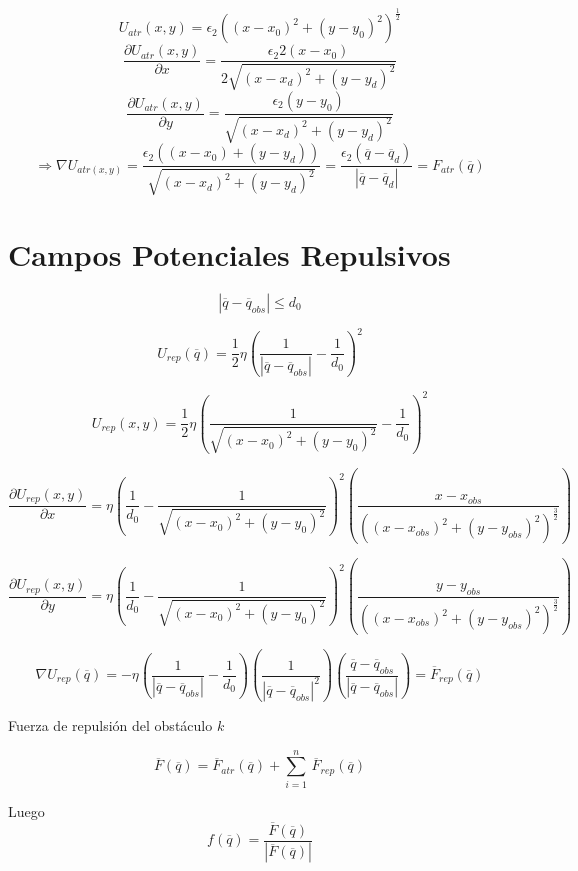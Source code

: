 $$U_{atr}(x,y) = \epsilon_{2} \left( (x - x_{0})^2 + (y - y_{0})^2 \right)^\frac{1}{2}
$$ 
$$\dfrac{\partial U_{atr}(x,y)}{\partial x} = \dfrac{\epsilon_{2}2(x - x_{0})}{2\sqrt{(x - x_{d})^2 + (y - y_{d})^2}}
$$
$$\dfrac{\partial U_{atr}(x,y)}{\partial y} = \dfrac{\epsilon_{2}(y - y_{0})}{\sqrt{(x - x_{d})^2 + (y - y_{d})^2}}
$$
$$\Rightarrow \nabla U_{atr(x,y)} = \dfrac{\epsilon_{2}\left( (x - x_{0}) + (y - y_{d})\right) }{\sqrt{(x - x_{d})^2 + (y - y_{d})^2}} = \dfrac{\epsilon_{2}(\overline{q} - \overline{q}_d)}{\left| \overline{q} - \overline{q}_{d} \right|} = F_{atr}(\overline{q})
$$



\section{Campos Potenciales Repulsivos}

$$\left| \overline{q} - \overline{q}_{obs}\right| \leq d_{0}$$ 

$$U_{rep}(\overline{q}) = \dfrac{1}{2} \eta \left( \dfrac{1}{\left| \overline{q} - \overline{q}_{obs}\right|}  
- \dfrac{1}{d_{0}} \right)^2$$

$$U_{rep}(x,y) = \dfrac{1}{2} \eta \left( \dfrac{1}{\sqrt{(x - x_{0})^2 + (y - y_{0})^2}}  
- \dfrac{1}{d_{0}} \right)^2$$

$$\dfrac{\partial U_{rep}(x,y)}{\partial x} = \eta \left( \dfrac{1}{d_{0}}  
-  \dfrac{1}{\sqrt{(x - x_{0})^2 + (y - y_{0})^2}} \right)^2 \left( \dfrac{x - x_{obs}}{\left( (x - x_{obs})^2 + (y - y_{obs})^2 \right)^{\frac{3}{2}}} \right)$$

$$\dfrac{\partial U_{rep}(x,y)}{\partial y} = \eta \left( \dfrac{1}{d_{0}}  
-  \dfrac{1}{\sqrt{(x - x_{0})^2 + (y - y_{0})^2}} \right)^2 \left( \dfrac{y - y_{obs}}{\left( (x - x_{obs})^2 + (y - y_{obs})^2 \right)^{\frac{3}{2}}} \right)$$

$$\nabla U_{rep}(\overline{q}) = -\eta \left( \dfrac{1}{\left| \overline{q} - \overline{q}_{obs}\right|} - \dfrac{1}{d_{0}} \right)  \left( \dfrac{1}{\left| \overline{q} - \overline{q}_{obs}\right|^2}\right)  \left( \dfrac{\overline{q} - \overline{q}_{obs}}{\left| \overline{q} - \overline{q}_{obs}\right|}\right) = \overline{F}_{rep}(\overline{q})$$

Fuerza de repulsión del obstáculo $k$

$$\overline{F}(\overline{q}) = \overline{F}_{atr}(\overline{q}) + \displaystyle \sum_{i = 1}^{n} \, \overline{F}_{rep}(\overline{q})$$

Luego
$$f(\overline{q}) = \dfrac{\overline{F}(\overline{q})}{\left|  \overline{F}(\overline{q}) \right| }$$

